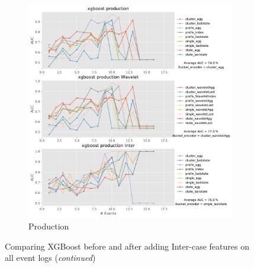 \documentclass[twoside,11pt]{Latex/Classes/PhDthesisPSnPDF}
\begin{document}
\begin{figure}[!htbp]
\begin{subfigure}{0.48\textwidth}
		\includegraphics[width=\linewidth]{images/inter/xgboost/production.pdf}
		\caption{Production} \label{fig:proi}
	\end{subfigure}\hspace*{\fill}
	\caption{Comparing XGBoost before and after adding Inter-case features on all event logs (\textit{continued})}
\label{fig:interx3}
\end{figure}


\end{document}
